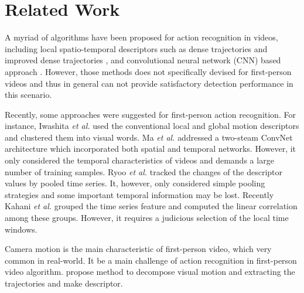 
\chapter{Related Work}
A myriad of algorithms have been proposed  for action recognition in
videos, including local spatio-temporal  descriptors such as dense
trajectories \cite{wang2013dense, wang2011action} and improved dense
trajectories \cite{wang2013action}, and convolutional neural network
(CNN) based approach \cite{wang2015action, simonyan2014two,
wang2015temporal}. However, those methods does not specifically
devised for first-person videos and thus in general can not provide
satisfactory detection performance in this scenario. 

Recently, some
approaches were suggested for first-person action recognition. For
instance,
Iwashita \textit{et al.} \cite{iwashita2014first} used the
conventional local and global motion descriptors and clustered them
into visual words. Ma \textit{et al.} \cite{ma2016going} addressed a
two-steam ConvNet architecture which incorporated both spatial and
temporal networks. However, it only considered the temporal
characteristics of videos and demands a large number of training
samples. Ryoo \textit{et al.} \cite{ryoo2015pooled} tracked the
changes of the descriptor values by pooled time series. It,
however, only considered simple pooling strategies and some 
important temporal information may be lost. Recently
Kahani \textit{et al.} \cite{kahani2016time} grouped the time series
feature and computed the linear correlation among these groups.
However, it requires a judicious  selection of the local time
windows.

Camera motion is the main characteristic of first-person video, which very common in real-world. It be a main challenge of action recognition in first-person video algorithm. \cite{kraft2014motion, jain2013better} propose method to decompose visual motion and extracting the trajectories and make descriptor. 


